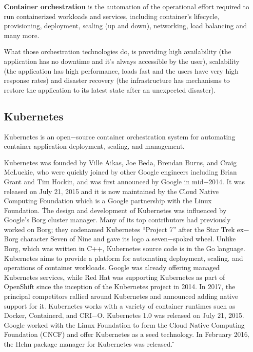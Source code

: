 \textbf{Container orchestration} is the automation of the operational effort required to run containerized workloads
and services, including container's lifecycle, provisioning, deployment, scaling (up and down), networking, load
balancing and many more.
\ed

What those orchestration technologies do, is providing high availability (the application has no downtime and it's
always accessible by the user), scalability (the application has high performance, loads fast and the users have very
high response rates) and disaster recovery (the infrastructure has mechanisms to restore the application to its
latest state after an unexpected disaster).

\subsection{Kubernetes}

\bd[Kubernetes]
Kubernetes is an open$-$source container orchestration system for automating container application deployment, scaling,
and management.
\ed

Kubernetes was founded by Ville Aikas, Joe Beda, Brendan Burns, and Craig McLuckie, who were quickly joined by other
Google engineers including Brian Grant and Tim Hockin, and was first announced by Google in mid$-$2014. It was
released on July 21, 2015 and it is now maintained by the Cloud Native Computing Foundation which is a Google
partnership with the Linux Foundation. \v

The design and development of Kubernetes was influenced by Google's Borg cluster manager. Many of its top
contributors had previously worked on Borg; they codenamed Kubernetes ``Project 7'' after the Star Trek ex$-$Borg
character Seven of Nine and gave its logo a seven$-$spoked wheel. Unlike Borg, which was written in C++, Kubernetes
source code is in the Go language. \v

Kubernetes aims to provide a platform for automating deployment, scaling, and operations of container workloads.
Google was already offering managed Kubernetes services, while Red Hat was supporting Kubernetes as part of OpenShift
since the inception of the Kubernetes project in 2014. In 2017, the principal competitors rallied around Kubernetes
and announced adding native support for it. Kubernetes works with a variety of container runtimes such as Docker,
Containerd, and CRI$-$O. \v

Kubernetes 1.0 was released on July 21, 2015. Google worked with the Linux Foundation to form the Cloud Native
Computing Foundation (CNCF) and offer Kubernetes as a seed technology. In February 2016, the Helm package manager for
Kubernetes was released. \v

